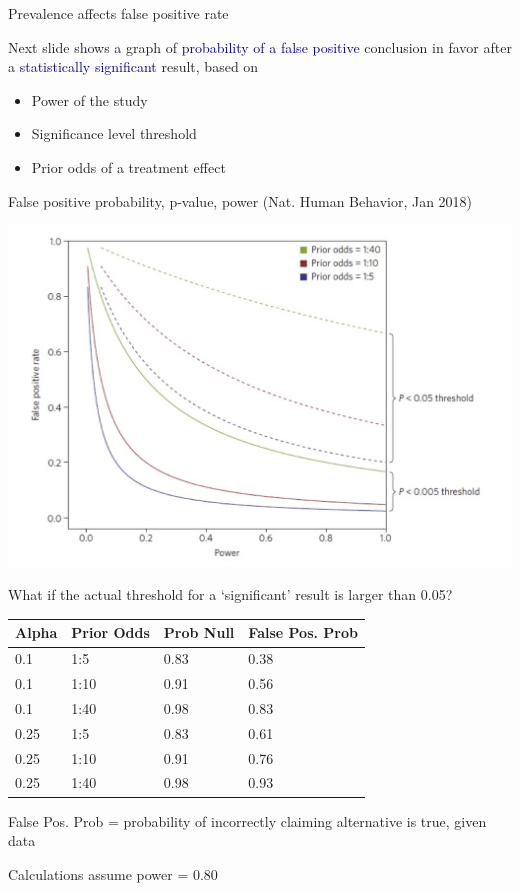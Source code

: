\documentclass[ignorenonframetext,]{beamer}
\begin{document}
\begin{frame}{Prevalence affects false positive rate}
\protect\hypertarget{prevalence-affects-false-positive-rate}{}

Next slide shows a graph of
\textcolor{darkblue}{probability of a false positive} conclusion in
favor after a \textcolor{darkblue}{statistically significant} result,
based on

\begin{itemize}
\item
  Power of the study
\item
  Significance level threshold
\item
  \textcolor{forest}{Prior odds of a treatment effect}
\end{itemize}

\end{frame}

\begin{frame}{False positive probability, p-value, power (Nat. Human
Behavior, Jan 2018)}
\protect\hypertarget{false-positive-probability-p-value-power-nat.-human-behavior-jan-2018}{}

\includegraphics[width=1\textwidth,height=\textheight]{../figures/ppv_threshold.jpeg}

\end{frame}

\begin{frame}{What if the actual threshold for a `significant' result is
larger than 0.05?}
\protect\hypertarget{what-if-the-actual-threshold-for-a-significant-result-is-larger-than-0.05}{}

\begin{longtable}[]{@{}llll@{}}
\toprule
Alpha & Prior Odds & Prob Null & False Pos. Prob\tabularnewline
\midrule
\endhead
0.1 & 1:5 & 0.83 & 0.38\tabularnewline
0.1 & 1:10 & 0.91 & 0.56\tabularnewline
0.1 & 1:40 & 0.98 & 0.83\tabularnewline
0.25 & 1:5 & 0.83 & 0.61\tabularnewline
0.25 & 1:10 & 0.91 & 0.76\tabularnewline
0.25 & 1:40 & 0.98 & 0.93\tabularnewline
\bottomrule
\end{longtable}

False Pos. Prob = probability of incorrectly claiming alternative is
true, given data

Calculations assume power = 0.80

\end{frame}
\end{document}
